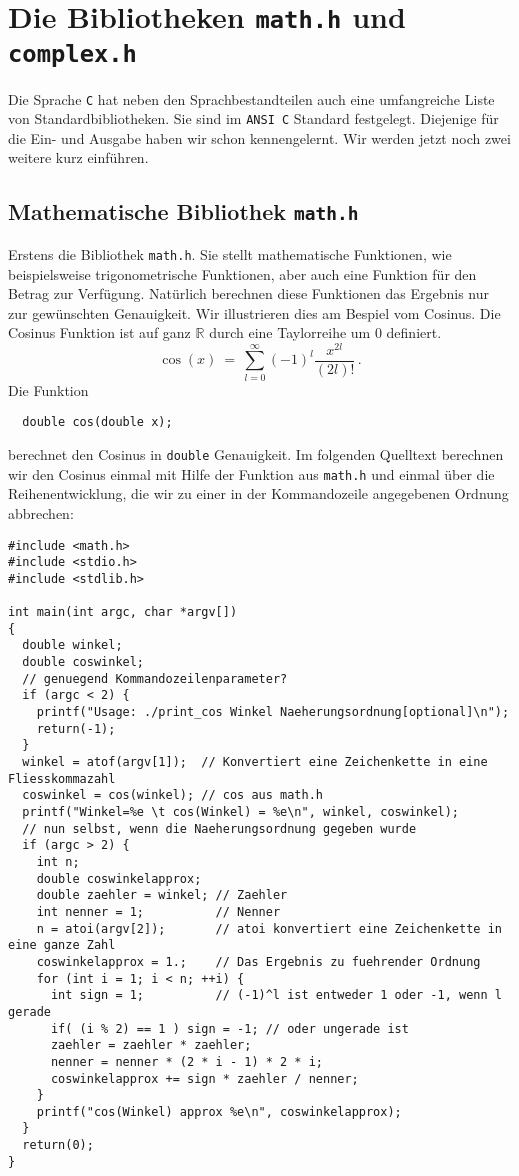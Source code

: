 \section{Die Bibliotheken \texttt{math.h} und \texttt{complex.h}}

Die Sprache \texttt{C} hat neben den Sprachbestandteilen auch eine umfangreiche Liste von Standardbibliotheken.
Sie sind im \texttt{ANSI C} Standard festgelegt.
Diejenige für die Ein- und Ausgabe haben wir schon kennengelernt.
Wir werden jetzt noch zwei weitere kurz einführen.

\subsection{Mathematische Bibliothek \texttt{math.h}}

Erstens die Bibliothek \texttt{math.h}.
Sie stellt mathematische Funktionen, wie beispielsweise trigonometrische Funktionen, aber auch eine Funktion für den Betrag zur Verfügung.
Natürlich berechnen diese Funktionen das Ergebnis nur zur gewünschten Genauigkeit.
Wir illustrieren dies am Bespiel vom Cosinus.
Die Cosinus Funktion ist auf ganz $\mathbb{R}$ durch eine Taylorreihe um 0 definiert.
\begin{equation}
  \label{eq:cos}
  \cos\left(x\right)\ =\ \sum_{l=0}^{\infty} \left(-1\right)^{l} \dfrac{x^{2l}}{\left(2l\right)!}\,.
\end{equation}
Die Funktion 
\begin{lstlisting}
  double cos(double x);
\end{lstlisting}
berechnet den Cosinus in \texttt{double} Genauigkeit.
Im folgenden Quelltext berechnen wir den Cosinus einmal mit Hilfe der Funktion aus \texttt{math.h} und einmal über die Reihenentwicklung, die wir zu einer in der Kommandozeile angegebenen Ordnung abbrechen:
\begin{lstlisting}[caption={Beispiel zur Verwendung des Cosinus}, belowcaptionskip=0.3em]
#include <math.h>
#include <stdio.h>
#include <stdlib.h>

int main(int argc, char *argv[])
{
  double winkel;
  double coswinkel;
  // genuegend Kommandozeilenparameter?
  if (argc < 2) {
    printf("Usage: ./print_cos Winkel Naeherungsordnung[optional]\n");
    return(-1);
  }
  winkel = atof(argv[1]);  // Konvertiert eine Zeichenkette in eine Fliesskommazahl
  coswinkel = cos(winkel); // cos aus math.h
  printf("Winkel=%e \t cos(Winkel) = %e\n", winkel, coswinkel);
  // nun selbst, wenn die Naeherungsordnung gegeben wurde
  if (argc > 2) {
    int n;
    double coswinkelapprox;
    double zaehler = winkel; // Zaehler
    int nenner = 1;          // Nenner
    n = atoi(argv[2]);       // atoi konvertiert eine Zeichenkette in eine ganze Zahl
    coswinkelapprox = 1.;    // Das Ergebnis zu fuehrender Ordnung
    for (int i = 1; i < n; ++i) {
      int sign = 1;          // (-1)^l ist entweder 1 oder -1, wenn l gerade
      if( (i % 2) == 1 ) sign = -1; // oder ungerade ist
      zaehler = zaehler * zaehler;
      nenner = nenner * (2 * i - 1) * 2 * i;
      coswinkelapprox += sign * zaehler / nenner;
    }
    printf("cos(Winkel) approx %e\n", coswinkelapprox);
  }
  return(0);
}
\end{lstlisting}
